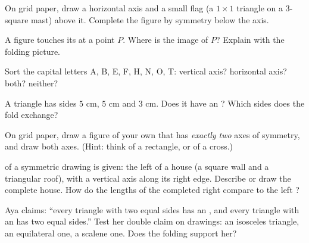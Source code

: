 \begin{exercise}[$\star$]\label{exo:g4:symmetry:5}
On grid paper, draw a horizontal axis and a small flag (a $1 \times
1$ triangle on a $3$-square mast) above it. Complete the figure by
symmetry below the axis.
\end{exercise}

\begin{exercise}[$\star$]\label{exo:g4:symmetry:6}
A figure touches its  at a point $P$. Where is the
image of $P$? Explain with the folding picture.
\end{exercise}

\begin{exercise}[$\star$]\label{exo:g4:symmetry:7}
Sort the capital letters A, B, E, F, H, N, O, T: vertical axis?
horizontal axis? both? neither?
\end{exercise}

\begin{exercise}[$\star$]\label{exo:g4:symmetry:8}
A triangle has sides $5$ cm, $5$ cm and $3$ cm. Does it have an
? Which sides does the fold exchange?
\end{exercise}

\begin{exercise}[$\star\star$]\label{exo:g4:symmetry:9}
On grid paper, draw a figure of your own that has \emph{exactly two}
axes of symmetry, and draw both axes. (Hint: think of a rectangle,
or of a cross.)
\end{exercise}

\begin{exercise}[$\star\star$]\label{exo:g4:symmetry:10}
 of a symmetric drawing is given: the left  of a house
(a square wall and  a triangular roof), with a vertical axis
along its right edge. Describe or draw the complete house. How do
the lengths of the completed right  compare to the left ?
\end{exercise}

\begin{exercise}[$\star\star$]\label{exo:g4:symmetry:11}
Aya claims: ``every triangle with two equal sides has an , and every triangle with an  has two equal
sides.'' Test her double claim on drawings: an isosceles triangle,
an equilateral one, a scalene one. Does the folding support her?
\end{exercise}
